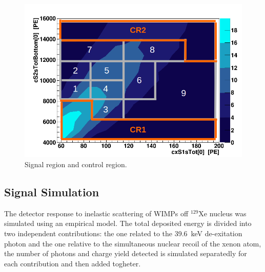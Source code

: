 \begin{figure}[t!]
  \includegraphics[width=\linewidth]{images/bkg_in_sr.png}
  \caption{Signal region and control region.}
  \label{fig:SR}
\end{figure}



\subsection{Signal Simulation} 
The detector response to inelastic scattering of WIMPs  off $^{129}$Xe nucleus was simulated using an empirical model.
The total deposited energy is divided into two independent contributions: the one related to the 39.6~keV de-exitation photon and the one  relative to
the simultaneous nuclear recoil of the xenon atom, the number of photons and charge yield detected is simulated separatedly for each contribution
and then added togheter.

